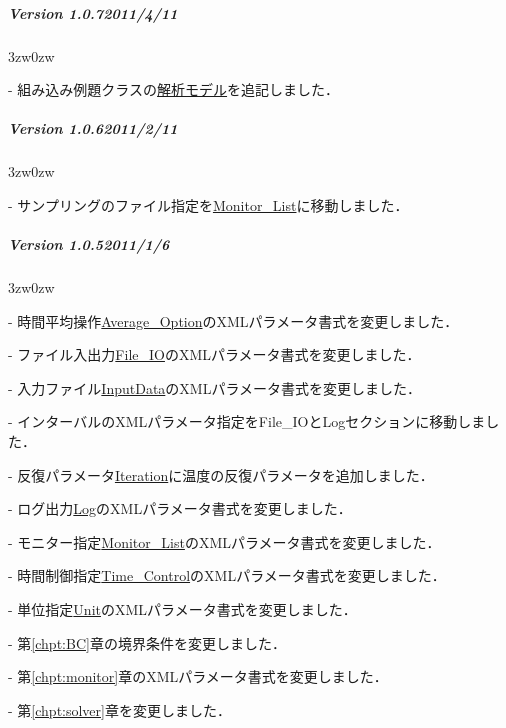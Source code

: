 {\vspace{3mm}

%
\subparagraph{Version 1.0.7\hspace{1cm}2011/4/11}

\begin{description}
\begin{indentation}{3zw}{0zw}
\item[-] 組み込み例題クラスの\hyperlink{tgt:intrinsic model}{解析モデル}を追記しました．
\end{indentation}
\end{description}

\vspace{3mm}

%
\subparagraph{Version 1.0.6\hspace{1cm}2011/2/11}

\begin{description}
\begin{indentation}{3zw}{0zw}
\item[-] サンプリングのファイル指定を\hyperlink{tgt:monitor_list}{Monitor\_List}に移動しました．
\end{indentation}
\end{description}

\vspace{3mm}

%
\subparagraph{Version 1.0.5\hspace{1cm}2011/1/6}

\begin{description}
\begin{indentation}{3zw}{0zw}
\item[-] 時間平均操作\hyperlink{tgt:average_option}{Average\_Option}のXMLパラメータ書式を変更しました．
\item[-] ファイル入出力\hyperlink{tgt:fileio}{File\_IO}のXMLパラメータ書式を変更しました．
\item[-] 入力ファイル\hyperlink{tgt:input_data}{InputData}のXMLパラメータ書式を変更しました．
\item[-] インターバルのXMLパラメータ指定をFile\_IOとLogセクションに移動しました．
\item[-] 反復パラメータ\hyperlink{tgt:iteration}{Iteration}に温度の反復パラメータを追加しました．
\item[-] ログ出力\hyperlink{tgt:log}{Log}のXMLパラメータ書式を変更しました．
\item[-] モニター指定\hyperlink{tgt:monitor_list}{Monitor\_List}のXMLパラメータ書式を変更しました．
\item[-] 時間制御指定\hyperlink{tgt:time_control}{Time\_Control}のXMLパラメータ書式を変更しました．
\item[-] 単位指定\hyperlink{tgt:unit}{Unit}のXMLパラメータ書式を変更しました．
\item[-] 第\ref{chpt:BC}章の境界条件を変更しました．
\item[-] 第\ref{chpt:monitor}章のXMLパラメータ書式を変更しました．
\item[-] 第\ref{chpt:solver}章を変更しました．
\end{indentation}
\end{description}

}
